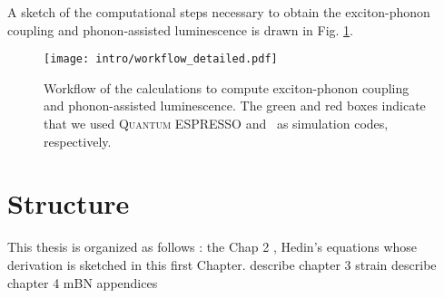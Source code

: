 A sketch of the computational steps necessary to obtain the exciton-phonon coupling and phonon-assisted luminescence is drawn in Fig. \ref{fig:workflow}.
\begin{figure}[h!b]
	\vspace{0.2cm}
	\setcapindent{2em}
	\centering
	\texttt{[image: intro/workflow\_detailed.pdf]}
	\caption{Workflow of the calculations to compute exciton-phonon coupling and phonon-assisted luminescence. The green and red boxes indicate that we used \textsc{Quantum ESPRESSO} and \yambo~as simulation codes, respectively.}
	\label{fig:workflow}
\end{figure}


\section{Structure}
This thesis is organized as follows : the 
Chap 2 , Hedin's equations whose derivation is sketched in this first Chapter.
describe chapter 3 strain
describe chapter 4 mBN
appendices




